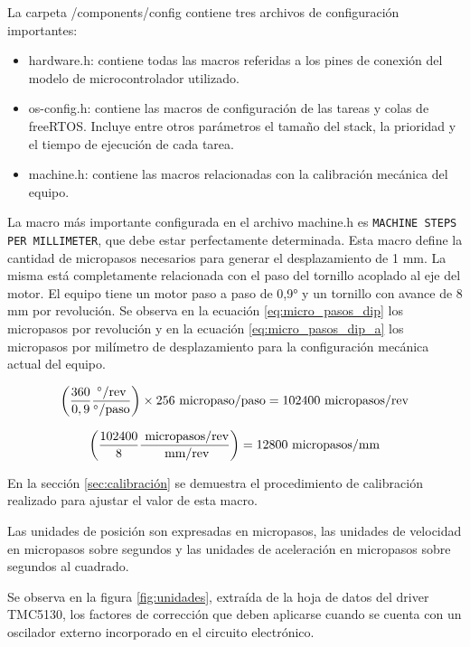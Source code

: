 La carpeta /components/config contiene tres archivos de configuración importantes:
\begin{itemize}
\item hardware.h: contiene todas las macros referidas a los pines de conexión del modelo de microcontrolador utilizado.
\item os-config.h: contiene las macros de configuración de las tareas y colas de freeRTOS. Incluye entre otros parámetros el tamaño del stack, la prioridad y el tiempo de ejecución de cada tarea.
\item machine.h: contiene las macros relacionadas con la calibración mecánica del equipo.
\end{itemize}


La macro más importante configurada en el archivo machine.h es \texttt{MACHINE STEPS PER MILLIMETER}, que debe estar perfectamente determinada.  Esta macro define la cantidad de micropasos necesarios para generar el desplazamiento de 1 mm. La misma está completamente relacionada con el paso del tornillo acoplado al eje del motor. El equipo tiene un motor paso a paso de \ang{0,9} y un tornillo con avance de 8 mm por revolución. Se observa en la ecuación \ref{eq:micro_pasos_dip} los micropasos por revolución y en la ecuación \ref{eq:micro_pasos_dip_a} los micropasos por milímetro de desplazamiento para la configuración mecánica actual del equipo.

\begin{equation}
	\label{eq:micro_pasos_dip}
		\left( \frac{360}{0,9} \frac{^\circ/\textup{rev}}{^\circ/\textup{paso}}\right) \times 256 \textup{ micropaso/paso} = 102400 \textup{ micropasos/rev}
\end{equation}

\begin{equation}
	\label{eq:micro_pasos_dip_a}
		\left( \frac{102400 }{8} \frac{\textup{ micropasos/rev}}{\textup{ mm/rev}} \right) = 12800 \textup{ micropasos/mm}
\end{equation}

En la sección \ref{sec:calibración} se demuestra el procedimiento de calibración realizado para ajustar el valor de esta macro.

Las unidades de posición son expresadas en micropasos, las unidades de velocidad en micropasos sobre segundos y las unidades de aceleración en micropasos sobre segundos al cuadrado. 

Se observa en la figura \ref{fig:unidades}, extraída de la hoja de datos del driver TMC5130, los factores de corrección que deben aplicarse cuando se cuenta con un oscilador externo incorporado en el circuito electrónico. 

